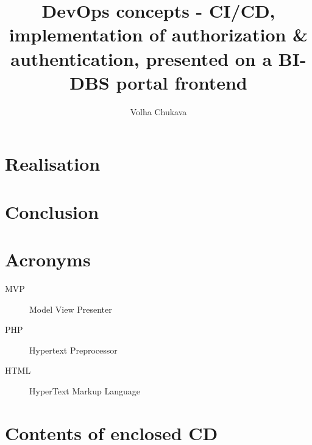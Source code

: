 \documentclass[thesis=B,english]{template/FITthesis}[2019/12/23]
\title{DevOps concepts - CI/CD, implementation of authorization \& authentication, presented on a BI-DBS portal frontend}
\author{Volha Chukava} %
\begin{document}





 
% 
% 
% 
% 

\chapter{Realisation}  %


\chapter{Conclusion}



\nocite{*}
\printbibliography[title={vfvf}]



\chapter{Acronyms}
\begin{description}
   \item[MVP] Model View Presenter
   \item[PHP] Hypertext Preprocessor
   \item[HTML] HyperText Markup Language
\end{description}


\chapter{Contents of enclosed CD}




\end{document}
